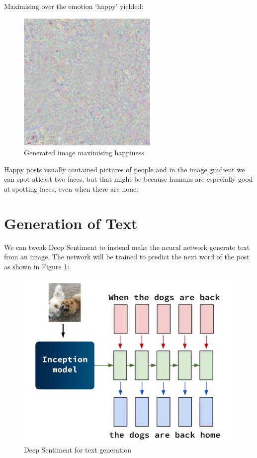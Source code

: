 Maximising over the emotion `happy' yielded:

\begin{figure}[H]
    \centering
    \includegraphics[width=0.6\textwidth]{Images/happy_gradient.png}
    \caption{Generated image maximising happiness}
\end{figure}

Happy posts usually contained pictures of people and in the image gradient we can spot atleast two faces, but that might be because humans are especially good at spotting faces, even when there are none.

\newpage
\section{Generation of Text}

We can tweak Deep Sentiment to instead make the neural network generate text from an image. The network will be trained to predict the next word of the post as shown in Figure \ref{deep-prediction}:

\begin{figure}[H]
    \centering
    \includegraphics[width=\textwidth]{Images/deep-prediction.jpg}
    \caption{Deep Sentiment for text generation}
    \label{deep-prediction}
\end{figure}

